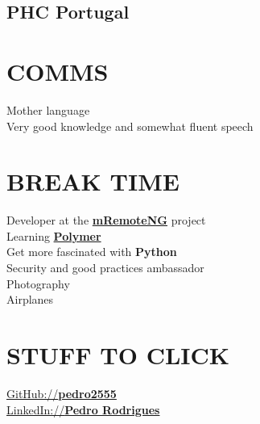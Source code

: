 \documentclass[letterpaper]{deedy-resume} %
\begin{document}
\begin{minipage}[t]{0.33\textwidth}
\subsection{PHC Portugal}

\sectionspace

\section{COMMS}
Mother language\\
Very good knowledge and somewhat fluent speech\\

\section{BREAK TIME}
Developer at the \textbf{\href{https://mremoteng.org/}{mRemoteNG}} project\\
Learning \textbf{\href{https://www.polymer-project.org/}{Polymer}}\\
Get more fascinated with \textbf{Python}\\
Security and good practices ambassador\\
Photography\\
Airplanes\\

\section{STUFF TO CLICK}
\href{https://github.com/pedro2555}{GitHub://\textbf{pedro2555}}\\
\href{https://www.linkedin.com/in/pedro-rodrigues-452b04ab?trk=hp-identity-name}{LinkedIn://\textbf{Pedro Rodrigues}}\\

\end{minipage}
\hfill
%
%
\end{document}
